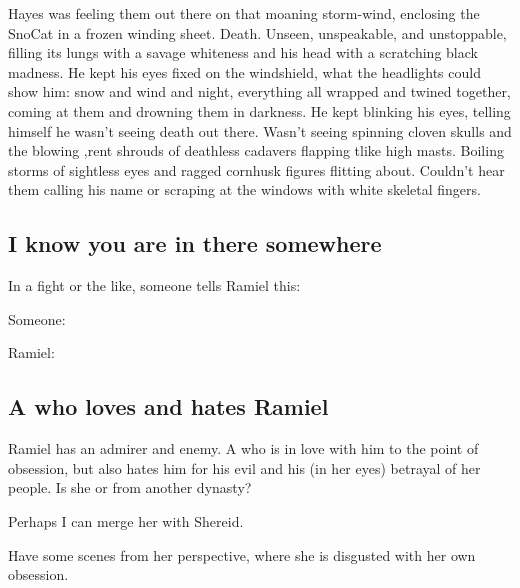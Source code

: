 {  Hayes was feeling them out there on that moaning storm-wind, enclosing the SnoCat in a frozen winding sheet.
  Death.
  Unseen, unspeakable, and unstoppable, filling its lungs with a savage whiteness and his head with a scratching black madness.
  He kept his eyes fixed on the windshield, what the headlights could show him: snow and wind and night, everything all wrapped and twined together, coming at them and drowning them in darkness.
  He kept blinking his eyes, telling himself he wasn't seeing death out there.
  Wasn't seeing spinning cloven skulls and the blowing ,rent shrouds of deathless cadavers flapping tlike high masts.
  Boiling storms of sightless eyes and ragged cornhusk figures flitting about.
  Couldn't hear them calling his name or scraping at the windows with white skeletal fingers. 
}






\subsection{I know you are in there somewhere}
In a fight or the like, someone tells Ramiel this: 

\begin{prose}
  Someone: 
  
  Ramiel: 
\end{prose}







\subsection{A \resvil{} who loves and hates Ramiel}
Ramiel has an admirer and enemy. A \resvil{} who is in love with him to the point of obsession, but also hates him for his evil and his (in her eyes) betrayal of her people. Is she \Mystraacht{} or from another dynasty?

Perhaps I can merge her with Shereid. 

Have some scenes from her perspective, where she is disgusted with her own obsession. 

